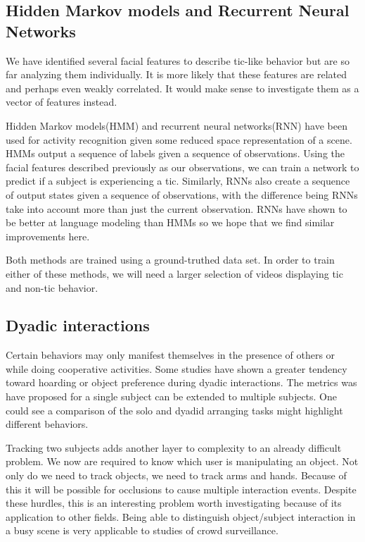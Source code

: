 \documentclass[11pt]{article}
\begin{document}
\subsection{Hidden Markov models and Recurrent Neural Networks}
We have identified several facial features to  describe tic-like behavior but are so far analyzing them individually. It is more likely that these features are related and perhaps even weakly correlated. It would make sense to investigate them as a vector of features instead.

Hidden Markov models(HMM) and recurrent neural networks(RNN) have been used for activity recognition given some reduced space representation of a scene. HMMs output a sequence of labels given a sequence of observations. Using the facial features described previously as our observations, we can train a network to predict if a subject is experiencing a tic. Similarly, RNNs also create a sequence of output states given a sequence of observations, with the difference being RNNs take into account more than just the current observation. RNNs have shown to be better at language modeling than HMMs so we hope that we find similar improvements here.

Both methods are trained using a ground-truthed data set. In order to train either of these methods, we will need a larger selection of videos displaying tic and non-tic behavior.

\subsection{Dyadic interactions}
Certain behaviors may only manifest themselves in the presence of others or while doing cooperative activities. Some studies have shown a greater tendency toward hoarding or object preference during dyadic interactions. The metrics was have proposed for a single subject can be extended to multiple subjects. One could see a comparison of the solo and dyadid arranging tasks might highlight different behaviors.

Tracking two subjects adds another layer to complexity to an already difficult problem. We now are required to know which user is manipulating an object. Not only do we need to track objects, we need to track arms and hands. Because of this it will be possible for occlusions to cause multiple interaction events. Despite these hurdles, this is an interesting problem worth investigating because of its application to other fields. Being able to distinguish object/subject interaction in a busy scene is very applicable to studies of crowd surveillance.
\end{document}
